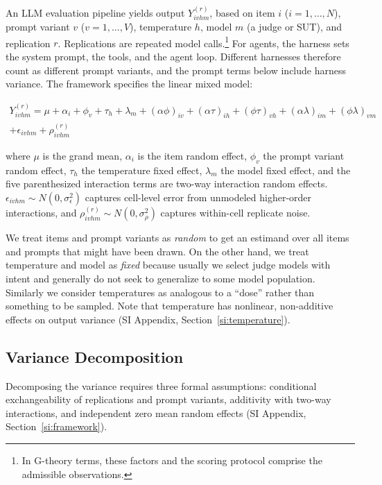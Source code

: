 \documentclass{article}
\begin{document}
An LLM evaluation pipeline yields output $Y_{ivhm}^{(r)}$, based on item $i$ ($i = 1, \ldots, N$), prompt variant $v$ ($v = 1, \ldots, V$), temperature $h$, model $m$ (a judge or SUT), and replication $r$. Replications are repeated model calls.\footnote{In G-theory terms, these factors and the scoring protocol comprise the admissible observations.} For agents, the harness sets the system prompt, the tools, and the agent loop. Different harnesses therefore count as different prompt variants, and the prompt terms below include harness variance. The framework specifies the linear mixed model:

\begin{equation}
\label{eq:dgp}
\begin{split}
Y_{ivhm}^{(r)} = \mu + \alpha_i + \phi_v + \tau_h + \lambda_m 
 + (\alpha\phi)_{iv} + (\alpha\tau)_{ih} + (\phi\tau)_{vh} 
 + (\alpha\lambda)_{im} + (\phi\lambda)_{vm} \\
 + \epsilon_{ivhm} + \rho_{ivhm}^{(r)}
\end{split}
\end{equation}

where $\mu$ is the grand mean, $\alpha_i$ is the item random effect, $\phi_v$ the prompt variant random effect, $\tau_h$ the temperature fixed effect, $\lambda_m$ the model fixed effect, and the five parenthesized interaction terms are two-way interaction random effects. $\epsilon_{ivhm} \sim N(0, \sigma^2_\epsilon)$ captures cell-level error from unmodeled higher-order interactions, and $\rho_{ivhm}^{(r)} \sim N(0, \sigma^2_\rho)$ captures within-cell replicate noise. %

We treat items and prompt variants as \emph{random} to get an estimand over all items and prompts that might have been drawn. On the other hand, we treat temperature and model as \emph{fixed} because usually we select judge models with intent and generally do not seek to generalize to some model population. Similarly we consider temperatures as analogous to a ``dose'' rather than something to be sampled. Note that temperature has nonlinear, non-additive effects on output variance \citep{renze2024temperature, li2025hotcold} (SI Appendix, Section~\ref{si:temperature}). %

\subsection{Variance Decomposition}
\label{sec:gstudy}

Decomposing the variance requires three formal assumptions: conditional exchangeability of replications and prompt variants, additivity with two-way interactions, and independent zero mean random effects (SI Appendix, Section~\ref{si:framework}). %
\end{document}
